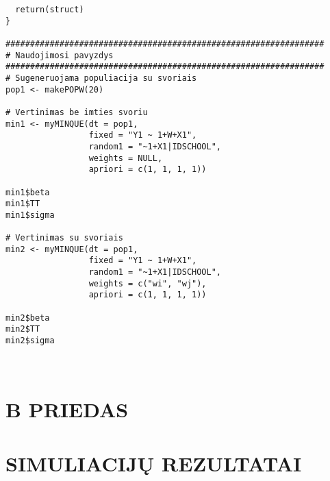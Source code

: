 \documentclass[12pt,a4paper]{article}
\begin{document}
\begin{appendix}
\begin{footnotesize}
\begin{verbatim}
  return(struct)
}

#################################################################
# Naudojimosi pavyzdys
#################################################################
# Sugeneruojama populiacija su svoriais
pop1 <- makePOPW(20)

# Vertinimas be imties svoriu
min1 <- myMINQUE(dt = pop1,
                 fixed = "Y1 ~ 1+W+X1",
                 random1 = "~1+X1|IDSCHOOL",
                 weights = NULL,
                 apriori = c(1, 1, 1, 1))

min1$beta
min1$TT
min1$sigma

# Vertinimas su svoriais
min2 <- myMINQUE(dt = pop1,
                 fixed = "Y1 ~ 1+W+X1",
                 random1 = "~1+X1|IDSCHOOL",
                 weights = c("wi", "wj"),
                 apriori = c(1, 1, 1, 1))

min2$beta
min2$TT
min2$sigma



\end{verbatim}
\end{footnotesize}
\end{appendix}


\newpage
 \hypertarget{appendixb}{\section*{B PRIEDAS}}
\section*{SIMULIACIJŲ REZULTATAI}\label{sec:lenteles}
\end{document}
